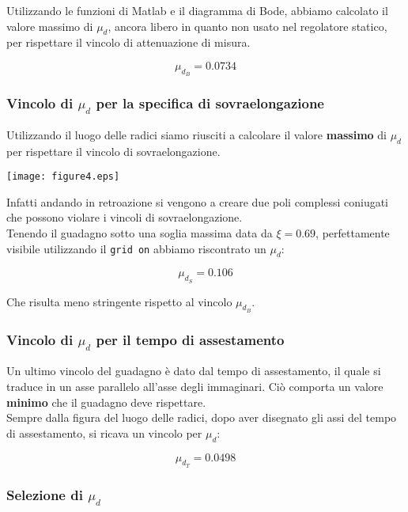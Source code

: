 \documentclass{article}
\begin{document}
Utilizzando le funzioni di Matlab e il diagramma di Bode, abbiamo calcolato il valore massimo di $\mu_d$, ancora libero in quanto non usato nel regolatore statico, per rispettare il vincolo di attenuazione di misura.

$$
    \mu_{d_B}=0.0734
$$

\newpage

\subsubsection{Vincolo di $\mu_d$ per la specifica di sovraelongazione}

Utilizzando il luogo delle radici siamo riusciti a calcolare il valore \textbf{massimo} di $\mu_d$ per rispettare il vincolo di sovraelongazione.

\begin{center}
    \texttt{[image: figure4.eps]}
\end{center}
Infatti andando in retroazione si vengono a creare due poli complessi coniugati che possono violare i vincoli di sovraelongazione.\\
Tenendo il guadagno sotto una soglia massima data da $\xi=0.69$, perfettamente visibile utilizzando il \texttt{grid on} abbiamo riscontrato un $\mu_d$:

$$
    \mu_{d_S} = 0.106
$$

Che risulta meno stringente rispetto al vincolo $\mu_{d_B}$.

\subsubsection{Vincolo di $\mu_d$ per il tempo di assestamento}

Un ultimo vincolo del guadagno è dato dal tempo di assestamento, il quale si traduce in un asse parallelo all'asse degli immaginari. Ciò comporta un valore \textbf{minimo} che il guadagno deve rispettare.\\

Sempre dalla figura del luogo delle radici, dopo aver disegnato gli assi del tempo di assestamento, si ricava un vincolo per $\mu_d$:

$$
    \mu_{d_T} = 0.0498
$$

\newpage

\subsubsection{Selezione di $\mu_d$}
\end{document}
